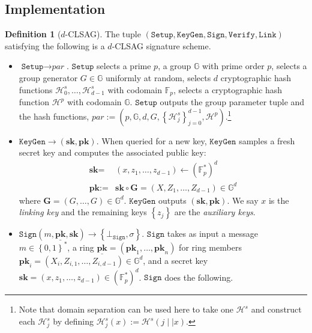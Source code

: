 \documentclass{mrl}
\theoremstyle{plain}
\theoremstyle{definition}
\newtheorem{definition}{Definition}[section]
\begin{document}
\subsection{Implementation}\label{sec:implem}
\begin{definition}[$d$-CLSAG]\label{def:clsag}
The tuple $(\texttt{Setup}, \texttt{KeyGen}, \texttt{Sign}, \texttt{Verify}, \allowbreak \texttt{Link})$ satisfying the following is a $d$-CLSAG signature scheme.

\begin{itemize}
\item $\texttt{Setup} \to \textit{par}$. $\texttt{Setup}$ selects a prime $p$, a group $\mathbb{G}$ with prime order $p$, selects a group generator $G \in \mathbb{G}$ uniformly at random, selects $d$ cryptographic hash functions $\mathcal{H}^s_0, \ldots, \mathcal{H}^s_{d-1}$ with codomain $\mathbb{F}_p$, selects a cryptographic hash function $\mathcal{H}^p$ with codomain $\mathbb{G}$. $\texttt{Setup}$ outputs the group parameter tuple and the hash functions, $\textit{par} := \left(p,\mathbb{G}, d, G, \left\{\mathcal{H}^s_j\right\}_{j=0}^{d-1}, \mathcal{H}^p\right)$.\footnote{Note that domain separation can be used here to take one $\mathcal{H}^s$ and construct each $\mathcal{H}^s_j$ by defining $\mathcal{H}^s_j(x) := \mathcal{H}^s(j \mid\mid x)$.}

\item $\texttt{KeyGen} \to (\textbf{sk}, \textbf{pk})$. When queried for a new key, $\texttt{KeyGen}$ samples a fresh secret key and computes the associated public key:
\begin{align*}
\textbf{sk} =& (x, z_1, \ldots, z_{d-1}) \leftarrow (\mathbb{F}_p^*)^d\\
\textbf{pk} :=& \textbf{sk} \circ \textbf{G} = (X, Z_1, \ldots, Z_{d-1}) \in \mathbb{G}^d
\end{align*} where $\textbf{G} = (G, \ldots, G) \in \mathbb{G}^d$. $\texttt{KeyGen}$ outputs $(\textbf{sk}, \textbf{pk})$. We say $x$ is the \textit{linking key} and the remaining keys $\left\{z_j\right\}$ are the \textit{auxiliary keys}.

\item $\texttt{Sign}\left(m, \underline{\textbf{pk}}, \textbf{sk}\right) \to \left\{\bot_{\texttt{Sign}}, \sigma\right\}$. $\texttt{Sign}$ takes as input a message $m \in \left\{0,1\right\}^*$, a ring  $\underline{\textbf{pk}} = (\textbf{pk}_1, \ldots, \textbf{pk}_n)$ for ring members $\textbf{pk}_i = (X_i, Z_{i,1}, \ldots, Z_{i,d-1}) \in \mathbb{G}^d$, and a secret key $\textbf{sk} = (x,z_1, \ldots, z_{d-1}) \in (\mathbb{F}_p^*)^d$. $\texttt{Sign}$ does the following.


\end{itemize}
\end{definition}
\end{document}
